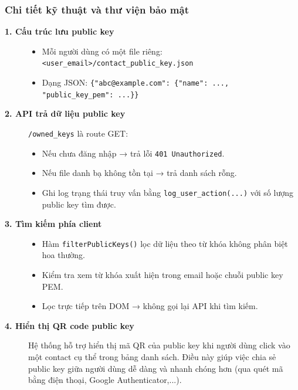 \subsubsection*{Chi tiết kỹ thuật và thư viện bảo mật}
\begin{description}

    \item[\textbf{1. Cấu trúc lưu public key}]
    \begin{itemize}
        \item Mỗi người dùng có một file riêng: \texttt{<user\_email>/contact\_public\_key.json}
        \item Dạng JSON: \texttt{\{"abc@example.com": \{"name": ..., "public\_key\_pem": ...\}\}}
    \end{itemize}

    \item[\textbf{2. API trả dữ liệu public key}]
    \texttt{/owned\_keys} là route GET:
    \begin{itemize}
        \item Nếu chưa đăng nhập → trả lỗi \texttt{401 Unauthorized}.
        \item Nếu file danh bạ không tồn tại → trả danh sách rỗng.
        \item Ghi log trạng thái truy vấn bằng \texttt{log\_user\_action(...)} với số lượng public key tìm được.
    \end{itemize}

    \item[\textbf{3. Tìm kiếm phía client}]
    \begin{itemize}
        \item Hàm \texttt{filterPublicKeys()} lọc dữ liệu theo từ khóa không phân biệt hoa thường.
        \item Kiểm tra xem từ khóa xuất hiện trong email hoặc chuỗi public key PEM.
        \item Lọc trực tiếp trên DOM → không gọi lại API khi tìm kiếm.
    \end{itemize}

    \item[\textbf{4. Hiển thị QR code public key}]
    Hệ thống hỗ trợ hiển thị mã QR của public key khi người dùng click vào một contact cụ thể trong bảng danh sách. Điều này giúp việc chia sẻ public key giữa người dùng dễ dàng và nhanh chóng hơn (qua quét mã bằng điện thoại, Google Authenticator,...).


\end{description}
